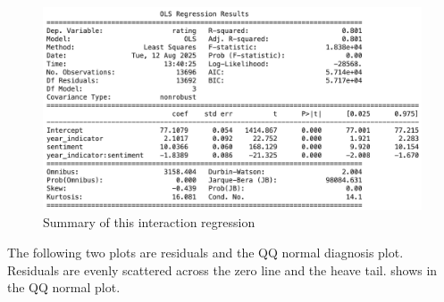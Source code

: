 \documentclass{article}
\begin{document}
\begin{figure}[!ht]
    \centering
    \includegraphics[width=0.6\linewidth]{indicator_regression.png}
    \caption{Summary of this interaction regression}
    \label{fig:placeholder}
\end{figure}
The following two plots are residuals and the QQ normal diagnosis plot. Residuals are evenly scattered across the zero line and the heave tail. shows in the QQ normal plot. 
\end{document}
